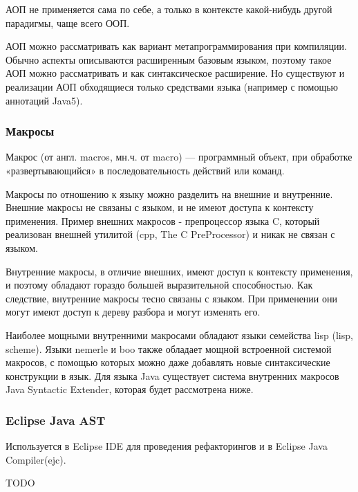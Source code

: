 \documentclass[a4paper,12pt]{article}
\begin{document}
АОП не применяется сама по себе, а только в контексте какой-нибудь другой
парадигмы, чаще всего ООП.

АОП можно рассматривать как вариант метапрограммирования при компиляции.
Обычно аспекты описываются расширенным базовым языком, поэтому такое АОП можно
рассматривать и как синтаксическое расширение. Но существуют и реализации АОП
обходящиеся только средствами языка (например с помощью аннотаций Java5).

\subsubsection{Макросы}
 Макрос (от англ. macros, мн.ч. от macro) — программный объект, при обработке
«развертывающийся» в последовательность действий или команд.

Макросы по отношению к языку можно разделить на внешние и внутренние.
Внешние макросы не связаны с языком, и не имеют доступа к контексту применения.
Пример внешних макросов - препроцессор языка C, который реализован внешней
утилитой (cpp, The C PreProcessor) и никак не связан с языком.

Внутренние макросы, в отличие внешних, имеют доступ к контексту применения, и
поэтому обладают гораздо большей выразительной способностью. Как следствие,
внутренние макросы тесно связаны с языком. При применении они могут имеют
доступ к дереву разбора и могут изменять его.

Наиболее мощными внутренними макросами обладают языки семейства lisp
(lisp, scheme). Языки nemerle и boo также обладает мощной встроенной системой
макросов, с помощью которых можно даже добавлять новые синтаксические
конструкции в язык. Для языка Java существует система внутренних макросов Java
Syntactic Extender, которая будет рассмотрена ниже.

\subsubsection{Eclipse Java AST}
Используется в Eclipse IDE для проведения рефакторингов и в Eclipse Java
Compiler(ejc).

TODO
\end{document}
